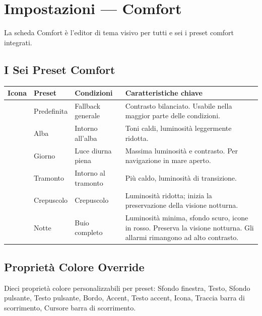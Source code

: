 \chapter{Impostazioni --- Comfort}
\label{ch:impostazioni-comfort}

La scheda Comfort è l'editor di tema visivo per tutti e sei i preset comfort integrati.

\section{I Sei Preset Comfort}

\begin{longtable}{C{1.5cm}L{2.2cm}L{4.0cm}L{6.0cm}}
\toprule
{}
\color{white}\sffamily\bfseries Icona &
\color{white}\sffamily\bfseries Preset &
\color{white}\sffamily\bfseries Condizioni &
\color{white}\sffamily\bfseries Caratteristiche chiave \\
\midrule
{} & Predefinita  & Fallback generale    & Contrasto bilanciato. Usabile nella maggior parte delle condizioni. \\
    & Alba         & Intorno all'alba     & Toni caldi, luminosità leggermente ridotta. \\
     & Giorno       & Luce diurna piena    & Massima luminosità e contrasto. Per navigazione in mare aperto. \\
  & Tramonto     & Intorno al tramonto  & Più caldo, luminosità di transizione. \\
    & Crepuscolo   & Crepuscolo           & Luminosità ridotta; inizia la preservazione della visione notturna. \\
   & Notte        & Buio completo        & Luminosità minima, sfondo scuro, icone in rosso.
  Preserva la visione notturna. Gli allarmi rimangono ad alto contrasto. \\
\bottomrule
\end{longtable}

\section{Proprietà Colore Override}

Dieci proprietà colore personalizzabili per preset: Sfondo finestra, Testo, Sfondo pulsante,
Testo pulsante, Bordo, Accent, Testo accent, Icona, Traccia barra di scorrimento,
Cursore barra di scorrimento.

